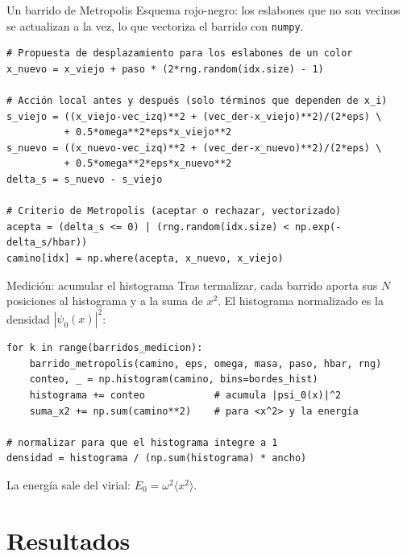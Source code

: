 \documentclass[aspectratio=169, 11pt]{beamer}
\begin{document}
\begin{frame}[fragile]{Un barrido de Metropolis}
  \small
  Esquema rojo-negro: los eslabones que no son vecinos se actualizan a la vez, lo
  que vectoriza el barrido con \texttt{numpy}.
  \vspace{0.1cm}
\begin{lstlisting}
# Propuesta de desplazamiento para los eslabones de un color
x_nuevo = x_viejo + paso * (2*rng.random(idx.size) - 1)

# Acción local antes y después (solo términos que dependen de x_i)
s_viejo = ((x_viejo-vec_izq)**2 + (vec_der-x_viejo)**2)/(2*eps) \
          + 0.5*omega**2*eps*x_viejo**2
s_nuevo = ((x_nuevo-vec_izq)**2 + (vec_der-x_nuevo)**2)/(2*eps) \
          + 0.5*omega**2*eps*x_nuevo**2
delta_s = s_nuevo - s_viejo

# Criterio de Metropolis (aceptar o rechazar, vectorizado)
acepta = (delta_s <= 0) | (rng.random(idx.size) < np.exp(-delta_s/hbar))
camino[idx] = np.where(acepta, x_nuevo, x_viejo)
\end{lstlisting}
\end{frame}

\begin{frame}[fragile]{Medición: acumular el histograma}
  \small
  Tras termalizar, cada barrido aporta sus $N$ posiciones al histograma y a la suma
  de $x^2$. El histograma normalizado es la densidad $|\psi_0(x)|^2$:
  \vspace{0.15cm}
\begin{lstlisting}
for k in range(barridos_medicion):
    barrido_metropolis(camino, eps, omega, masa, paso, hbar, rng)
    conteo, _ = np.histogram(camino, bins=bordes_hist)
    histograma += conteo            # acumula |psi_0(x)|^2
    suma_x2 += np.sum(camino**2)    # para <x^2> y la energía

# normalizar para que el histograma integre a 1
densidad = histograma / (np.sum(histograma) * ancho)
\end{lstlisting}
  \vspace{0.1cm}
  La energía sale del virial: $E_0 = \omega^2 \langle x^2 \rangle$.
\end{frame}

\section{Resultados}
\end{document}
